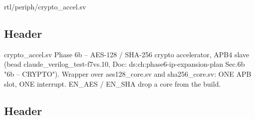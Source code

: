 \begin{relocated}{rtl/periph/crypto_accel.sv}

\subsection*{Header}

\begin{textblock}
crypto_accel.sv
Phase 6b -- AES-128 / SHA-256 crypto accelerator, APB4 slave (bead claude_verilog_test-f7vs.10,
Doc: ds:ch:phase6-ip-expansion-plan Sec.6b "6b -- CRYPTO"). Wrapper over aes128_core.sv and
sha256_core.sv: ONE APB slot, ONE interrupt. EN_AES / EN_SHA drop a core from the build.
\end{textblock}

\subsection*{Header}


\end{relocated}
